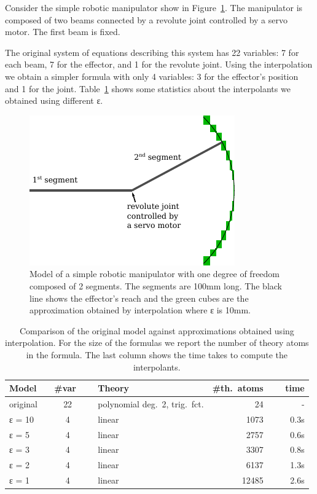 \begin{example}
Consider the simple robotic manipulator show in Figure~\ref{fig:robot}.
The manipulator is composed of two beams connected by a revolute joint controlled by a servo motor.
The first beam is fixed.

The original system of equations describing this system has 22 variables: 7 for each beam, 7 for the effector, and 1 for the revolute joint.
Using the interpolation we obtain a simpler formula with only 4 variables: 3 for the effector's position and 1 for the joint.
Table~\ref{tbl:robot} shows some statistics about the interpolants we obtained using different ε.


\begin{figure}
\centering
\includegraphics[scale=1]{img/arm.pdf}
\caption{
    Model of a simple robotic manipulator with one degree of freedom composed of 2 segments.
    The segments are 100mm long.
    The black line shows the effector's reach and the green cubes are the approximation obtained by interpolation where ε is 10mm.
}
\label{fig:robot}
\end{figure}

\begin{table}
\centering
\begin{tabular}{l|clrr}
Model    & ~ \#var  ~~ & Theory   & \#th.~atoms & ~~ time \\
\hline
original & 22 & polynomial deg.~2, trig.~fct.   & 24    & - \\
ε = 10   & 4  & linear                          & 1073  & 0.3s \\
ε = 5    & 4  & linear                          & 2757  & 0.6s \\
ε = 3    & 4  & linear                          & 3307  & 0.8s \\
ε = 2    & 4  & linear                          & 6137  & 1.3s \\
ε = 1    & 4  & linear                          & 12485 & 2.6s \\
\end{tabular}
\caption{
    Comparison of the original model against approximations obtained using interpolation.
    For the size of the formulas we report the number of theory atoms in the formula.
    The last column shows the time \dReal takes to compute the interpolants.
}
\label{tbl:robot}
\end{table}


\end{example}
